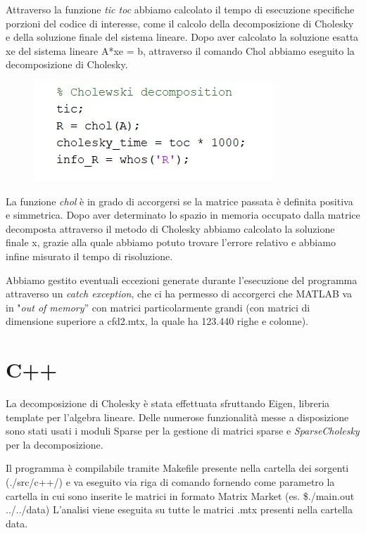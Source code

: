 \documentclass[a4paper,12pt]{article}
\begin{document}
\noindent Attraverso la funzione \textit{tic toc} abbiamo calcolato il tempo di esecuzione specifiche porzioni del codice di interesse, come il calcolo della decomposizione di Cholesky e della soluzione finale del sistema lineare.
Dopo aver calcolato la soluzione esatta xe del sistema lineare A*xe = b, attraverso il comando Chol abbiamo eseguito la decomposizione di Cholesky. 
\bigskip

\begin{figure}[H]
\centering
\includegraphics[width=0.4\linewidth]{img/matlab2.jpg}
\label{fig:2}
\end{figure}

\noindent La funzione \textit{chol} è in grado di accorgersi se la matrice passata è definita positiva e simmetrica. Dopo aver determinato lo spazio in memoria occupato dalla matrice decomposta attraverso il metodo di Cholesky abbiamo calcolato la soluzione finale x, grazie alla quale abbiamo potuto trovare l’errore relativo e abbiamo infine misurato il tempo di risoluzione.
\bigskip

\noindent Abbiamo gestito eventuali eccezioni generate durante l’esecuzione del programma attraverso un \textit{catch exception}, che ci ha permesso di accorgerci che MATLAB va in "\textit{out of memory}” con matrici particolarmente grandi (con matrici di dimensione superiore a cfd2.mtx, la quale ha 123.440 righe e colonne).

\newpage 

\section{C++}
La decomposizione di Cholesky è stata effettuata sfruttando Eigen, libreria template per l’algebra lineare. Delle numerose funzionalità messe a disposizione sono stati usati i moduli Sparse per la gestione di matrici sparse e \textit{SparseCholesky} per la decomposizione. 
\bigskip

\noindent Il programma è compilabile tramite Makefile presente nella cartella dei sorgenti (./src/c++/) e va eseguito via riga di comando fornendo come parametro la cartella in cui sono inserite le matrici in formato Matrix Market (es. \$./main.out ../../data)
L’analisi viene eseguita su tutte le matrici .mtx presenti nella cartella data. 
\bigskip
\end{document}
